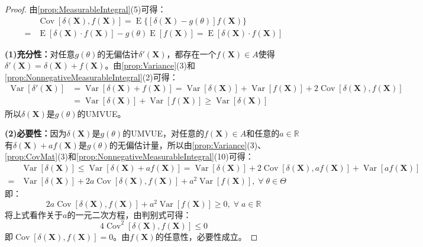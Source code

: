 \begin{proof}
	由\cref{prop:MeasurableIntegral}(5)可得：
	\begin{align*}
		&\operatorname{Cov}[\delta(\mathbf{X}),f(\mathbf{X})]=\operatorname{E}\{[\delta(\mathbf{X})-g(\theta)]f(\mathbf{X})\} \\
		=&\operatorname{E}[\delta(\mathbf{X})\cdot f(\mathbf{X})]-g(\theta)\operatorname{E}[f(\mathbf{X})]=\operatorname{E}[\delta(\mathbf{X})\cdot f(\mathbf{X})]
	\end{align*}\par
	\textbf{(1)充分性：}对任意$g(\theta)$的无偏估计$\delta'(\mathbf{X})$，都存在一个$f(\mathbf{X})\in A$使得$\delta'(\mathbf{X})=\delta(\mathbf{X})+f(\mathbf{X})$。由\cref{prop:Variance}(3)和\cref{prop:NonnegativeMeasurableIntegral}(2)可得：
	\begin{align*}
		\operatorname{Var}[\delta'(\mathbf{X})]&=\operatorname{Var}[\delta(\mathbf{X})+f(\mathbf{X})]=\operatorname{Var}[\delta(\mathbf{X})]+\operatorname{Var}[f(\mathbf{X})]+2\operatorname{Cov}[\delta(\mathbf{X}),f(\mathbf{X})] \\
		&=\operatorname{Var}[\delta(\mathbf{X})]+\operatorname{Var}[f(\mathbf{X})]\geqslant\operatorname{Var}[\delta(\mathbf{X})]
	\end{align*}
	所以$\delta(\mathbf{X})$是$g(\theta)$的UMVUE。\par
	\textbf{(2)必要性：}因为$\delta(\mathbf{X})$是$g(\theta)$的UMVUE，对任意的$f(\mathbf{X})\in A$和任意的$a\in\mathbb{R}^{}$有$\delta(\mathbf{X})+af(\mathbf{X})$是$g(\theta)$的无偏估计量，所以由\cref{prop:Variance}(3)、\cref{prop:CovMat}(3)和\cref{prop:NonnegativeMeasurableIntegral}(10)可得：
	\begin{align*}
		&\operatorname{Var}[\delta(\mathbf{X})]\leqslant\operatorname{Var}[\delta(\mathbf{X})+af(\mathbf{X})]=\operatorname{Var}[\delta(\mathbf{X})]+2\operatorname{Cov}[\delta(\mathbf{X}),af(\mathbf{X})]+\operatorname{Var}[af(\mathbf{X})] \\
		=&\operatorname{Var}[\delta(\mathbf{X})]+2a\operatorname{Cov}[\delta(\mathbf{X}),f(\mathbf{X})]+a^2\operatorname{Var}[f(\mathbf{X})],\;\forall\;\theta\in\Theta
	\end{align*}
	即：
	\begin{equation*}
		2a\operatorname{Cov}[\delta(\mathbf{X}),f(\mathbf{X})]+a^2\operatorname{Var}[f(\mathbf{X})]\geqslant0,\;\forall\;a\in\mathbb{R}^{}
	\end{equation*}
	将上式看作关于$a$的一元二次方程，由判别式可得：
	\begin{equation*}
		4\operatorname{Cov}^2[\delta(\mathbf{X}),f(\mathbf{X})]\leqslant0
	\end{equation*}
	即$\operatorname{Cov}[\delta(\mathbf{X}),f(\mathbf{X})]=0$。由$f(\mathbf{X})$的任意性，必要性成立。
\end{proof}